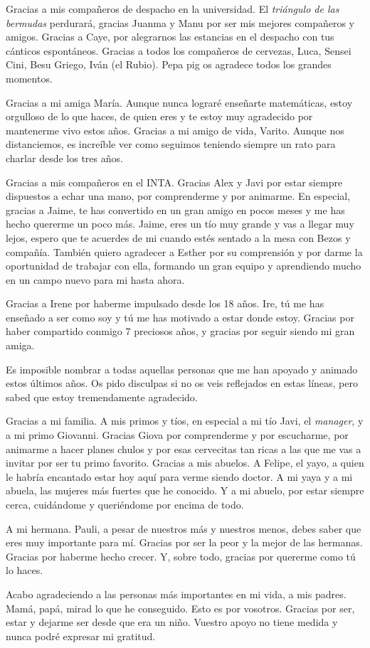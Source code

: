 \begin{acknowledgements}
Gracias a mis compañeros de despacho en la universidad. El \textit{triángulo de las bermudas} perdurará, gracias Juanma y Manu por ser mis mejores compañeros y amigos. Gracias a Caye, por alegrarnos las estancias en el despacho con tus cánticos espontáneos. Gracias a todos los compañeros de cervezas, Luca, Sensei Cini, Besu Griego, Iván (el Rubio). Pepa pig os agradece todos los grandes momentos.

Gracias a mi amiga María. Aunque nunca lograré enseñarte matemáticas, estoy orgulloso de lo que haces, de quien eres y te estoy muy agradecido por mantenerme vivo estos años. Gracias a mi amigo de vida, Varito. Aunque nos distanciemos, es increíble ver como seguimos teniendo siempre un rato para charlar desde los tres años.

Gracias a mis compañeros en el INTA. Gracias Alex y Javi por estar siempre dispuestos a echar una mano, por comprenderme y por animarme. En especial, gracias a Jaime, te has convertido en un gran amigo en pocos meses y me has hecho quererme un poco más. Jaime, eres un tío muy grande y vas a llegar muy lejos, espero que te acuerdes de mi cuando estés sentado a la mesa con Bezos y compañía. También quiero agradecer a Esther por su comprensión y por darme la oportunidad de trabajar con ella, formando un gran equipo y aprendiendo mucho en un campo nuevo para mi hasta ahora.

Gracias a Irene por haberme impulsado desde los 18 años. Ire, tú me has enseñado a ser como soy y tú me has motivado a estar donde estoy. Gracias por haber compartido conmigo 7 preciosos años, y gracias por seguir siendo mi gran amiga.

Es imposible nombrar a todas aquellas personas que me han apoyado y animado estos últimos años. Os pido disculpas si no os veis reflejados en estas líneas, pero sabed que estoy tremendamente agradecido.

Gracias a mi familia. A mis primos y tíos, en especial a mi tío Javi, el \textit{manager}, y a mi primo Giovanni. Gracias Giova por comprenderme y por escucharme, por animarme a hacer planes chulos y por esas cervecitas tan ricas a las que me vas a invitar por ser tu primo favorito. Gracias a mis abuelos. A Felipe, el yayo, a quien le habría encantado estar hoy aquí para verme siendo doctor. A mi yaya y a mi abuela, las mujeres más fuertes que he conocido. Y a mi abuelo, por estar siempre cerca, cuidándome y queriéndome por encima de todo.

A mi hermana. Pauli, a pesar de nuestros más y nuestros menos, debes saber que eres muy importante para mí. Gracias por ser la peor y la mejor de las hermanas. Gracias por haberme hecho crecer. Y, sobre todo, gracias por quererme como tú lo haces.

Acabo agradeciendo a las personas más importantes en mi vida, a mis padres. Mamá, papá, mirad lo que he conseguido. Esto es por vosotros. Gracias por ser, estar y dejarme ser desde que era un niño. Vuestro apoyo no tiene medida y nunca podré expresar mi gratitud.

\end{acknowledgements}
